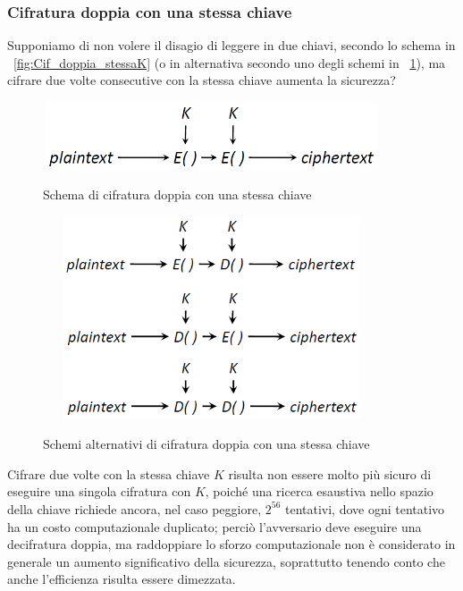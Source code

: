 \subsubsection{Cifratura doppia con una stessa chiave}
Supponiamo di non volere il disagio di leggere in due chiavi, secondo lo schema in \figurename ~\ref{fig:Cif_doppia_stessaK} (o in alternativa secondo uno degli schemi in \figurename ~\ref{fig:Cif_doppia_stessaK_alternative}), ma cifrare due volte consecutive con la stessa chiave aumenta la sicurezza?
\begin{figure}[htbp]
	\centering%
	\subfigure%
	{\includegraphics[height=2cm, width=10cm, keepaspectratio]{Immagini/Capitolo3/Cif_doppia_stessaK.png}}
	\caption{Schema di cifratura doppia con una stessa chiave \label{fig:Cif_doppia_stessaK}} 
	\subfigure%
	{\includegraphics[height=6cm, width=10cm, keepaspectratio]{Immagini/Capitolo3/Cif_doppia_stessaK_alternative.png}}
	\caption{Schemi alternativi di cifratura doppia con una stessa chiave \label{fig:Cif_doppia_stessaK_alternative}} 
\end{figure}
Cifrare due volte con la stessa chiave $K$ risulta non essere molto più sicuro di eseguire una singola cifratura con $K$, poiché una ricerca esaustiva nello spazio della chiave richiede ancora, nel caso peggiore, $2^{56}$ tentativi, dove ogni tentativo ha un costo computazionale duplicato; perciò l'avversario deve eseguire una decifratura doppia, ma raddoppiare lo sforzo computazionale non è considerato in generale un aumento significativo della sicurezza, soprattutto tenendo conto che anche l'efficienza risulta essere dimezzata.

